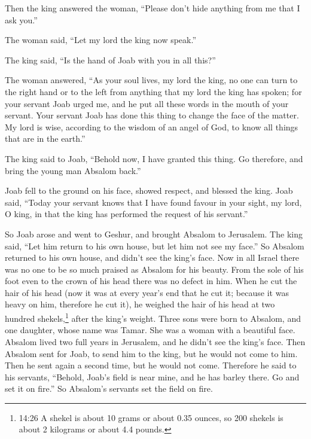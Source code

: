  Then the king answered the woman, ``Please don't hide
anything from me that I ask you.''

The woman said, ``Let my lord the king now speak.''

 The king said, ``Is the hand of Joab with you in all
this?''

The woman answered, ``As your soul lives, my lord the king, no one can
turn to the right hand or to the left from anything that my lord the
king has spoken; for your servant Joab urged me, and he put all these
words in the mouth of your servant.  Your servant Joab has
done this thing to change the face of the matter. My lord is wise,
according to the wisdom of an angel of God, to know all things that are
in the earth.''

 The king said to Joab, ``Behold now, I have granted this
thing. Go therefore, and bring the young man Absalom back.''

 Joab fell to the ground on his face, showed respect, and
blessed the king. Joab said, ``Today your servant knows that I have
found favour in your sight, my lord, O king, in that the king has
performed the request of his servant.''

 So Joab arose and went to Geshur, and brought Absalom to
Jerusalem.  The king said, ``Let him return to his own
house, but let him not see my face.'' So Absalom returned to his own
house, and didn't see the king's face.  Now in all Israel
there was no one to be so much praised as Absalom for his beauty. From
the sole of his foot even to the crown of his head there was no defect
in him.  When he cut the hair of his head (now it was at
every year's end that he cut it; because it was heavy on him, therefore
he cut it), he weighed the hair of his head at two hundred
shekels,\footnote{14:26 A shekel is about 10 grams or about 0.35 ounces,
  so 200 shekels is about 2 kilograms or about 4.4 pounds.} after the
king's weight.  Three sons were born to Absalom, and one
daughter, whose name was Tamar. She was a woman with a beautiful face.
 Absalom lived two full years in Jerusalem, and he didn't
see the king's face.  Then Absalom sent for Joab, to send
him to the king, but he would not come to him. Then he sent again a
second time, but he would not come.  Therefore he said to
his servants, ``Behold, Joab's field is near mine, and he has barley
there. Go and set it on fire.'' So Absalom's servants set the field on
fire.

